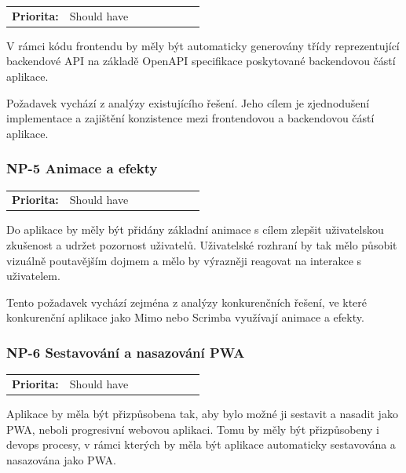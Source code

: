 \begin{tabular}{lp{0.7\linewidth}}
    \textbf{Priorita:} & Should have \\
\end{tabular}

V rámci kódu frontendu by měly být automaticky generovány třídy reprezentující backendové API na základě OpenAPI specifikace \cite{OpenAPISpecification} poskytované backendovou částí aplikace.

Požadavek vychází z analýzy existujícího řešení. Jeho cílem je zjednodušení implementace a zajištění konzistence mezi frontendovou a backendovou částí aplikace.

\subsubsection{NP-5 Animace a efekty}

\begin{tabular}{lp{0.7\linewidth}}
    \textbf{Priorita:} & Should have \\
\end{tabular}

Do aplikace by měly být přidány základní animace s cílem zlepšit uživatelskou zkušenost a udržet pozornost uživatelů. Uživatelské rozhraní by tak mělo působit vizuálně poutavějším dojmem a mělo by výrazněji reagovat na interakce s uživatelem.

Tento požadavek vychází zejména z analýzy konkurenčních řešení, ve které konkurenční aplikace jako Mimo nebo Scrimba využívají animace a efekty.

\subsubsection{NP-6 Sestavování a nasazování PWA}

\begin{tabular}{lp{0.7\linewidth}}
    \textbf{Priorita:} & Should have \\
\end{tabular}

Aplikace by měla být přizpůsobena tak, aby bylo možné ji sestavit a nasadit jako PWA, neboli progresivní webovou aplikaci. Tomu by měly být přizpůsobeny i devops procesy, v rámci kterých by měla být aplikace automaticky sestavována a nasazována jako PWA.



